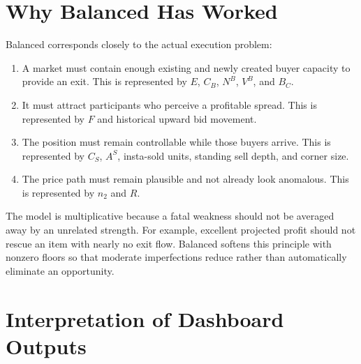 \documentclass[11pt,a4paper]{article}
\begin{document}
\section{Why Balanced Has Worked}

Balanced corresponds closely to the actual execution problem:

\begin{enumerate}
  \item A market must contain enough existing and newly created buyer capacity to provide an
  exit. This is represented by $E$, $C_B$, $N^B$, $V^B$, and $B_C$.
  \item It must attract participants who perceive a profitable spread. This is represented by
  $F$ and historical upward bid movement.
  \item The position must remain controllable while those buyers arrive. This is represented by
  $C_S$, $A^S$, insta-sold units, standing sell depth, and corner size.
  \item The price path must remain plausible and not already look anomalous. This is represented
  by $n_2$ and $R$.
\end{enumerate}

The model is multiplicative because a fatal weakness should not be averaged away by an
unrelated strength. For example, excellent projected profit should not rescue an item with
nearly no exit flow. Balanced softens this principle with nonzero floors so that moderate
imperfections reduce rather than automatically eliminate an opportunity.

\section{Interpretation of Dashboard Outputs}
\end{document}
